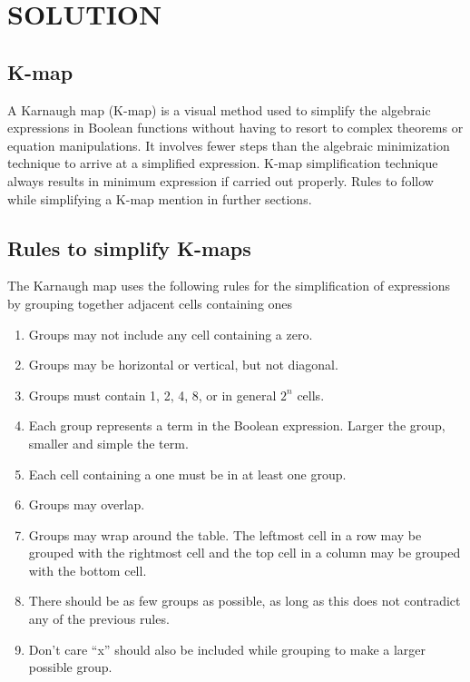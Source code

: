 \documentclass[10pt, a4paper]{article}
\begin{document}
\section{SOLUTION}
\subsection{K-map}
\hspace{10cm}
A Karnaugh map (K-map) is a visual method used to simplify the algebraic expressions in Boolean functions without having to resort to complex theorems or equation manipulations.  It involves fewer steps than the algebraic minimization technique to arrive at a simplified expression. K-map simplification technique always results in minimum expression if carried out properly. Rules to follow while simplifying a K-map mention in further sections. \\ 
\subsection{Rules to simplify K-maps}
\hspace{10cm}
The Karnaugh map uses the following rules for the simplification of expressions by grouping together adjacent cells containing ones
\vspace{4pt}
\begin{enumerate}
\item Groups may not include any cell containing a zero.
    \item Groups may be horizontal or vertical, but not diagonal.
    \item Groups must contain 1, 2, 4, 8, or in general $2^n$ cells.
    \item Each group represents a term in the Boolean expression. Larger the group, smaller and simple the term.
    \item Each cell containing a one must be in at least one group.
    \item Groups may overlap.
    \item Groups may wrap around the table. The leftmost cell in a row may be grouped with the rightmost cell and the top cell in a column may be grouped with the bottom cell. 
    \item There should be as few groups as possible, as long as this does not contradict any of the previous rules.
    \item Don’t care “x” should also be included while grouping to make a larger possible group.
\end{enumerate}
\newpage
\end{document}
